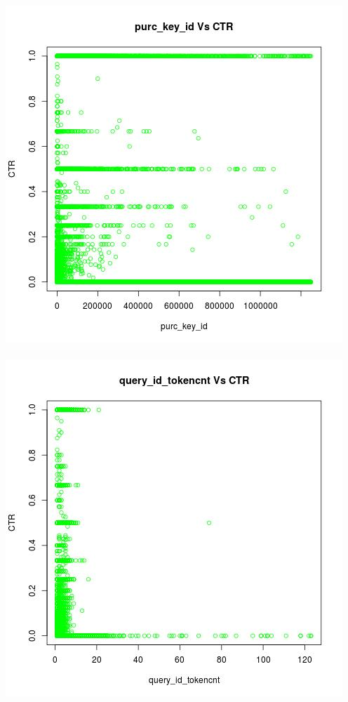 \documentclass[10pt]{article}
\begin{document}
\includegraphics[scale=0.5]{purc_key_id_Vs_CTR}\\\\
\includegraphics[scale=0.5]{query_id_tokencnt_Vs_CTR}
\end{document}
